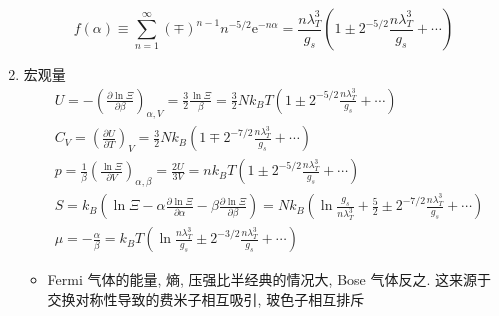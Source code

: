\documentclass[12pt,a4paper]{article}%
\numberwithin{equation}{section}
\newcommand\e{\mathrm{e}}%
\begin{document}
\begin{enumerate}
\begin{equation}
        f(\alpha) \equiv \sum_{n=1}^\infty(\mp)^{n-1}n^{-5/2}\e^{-n\alpha} 
        = \frac{n\lambda_T^3}{g_s}\left(1\pm 2^{-5/2}\frac{n\lambda_T^3}{g_s}+\cdots\right)
    \end{equation}
    \item 宏观量
    \begin{align}
        &U = -\left(\frac{\partial\ln\Xi}{\partial\beta}\right)_{\alpha, V}
        =\frac 32\frac{\ln\Xi}\beta 
        = \frac 32 Nk_B T\left(1\pm 2^{-5/2}\frac{n\lambda_T^3}{g_s} + \cdots\right)\\
        &C_V = \left(\frac{\partial U}{\partial T}\right)_V 
        = \frac 32Nk_B \left(1\mp 2^{-7/2}\frac{n\lambda_T^3}{g_s} + \cdots\right) \label{equ:cv_for_quantum_gas}\\
        &p = \frac 1\beta \left(\frac{\ln\Xi}{\partial V}\right)_{\alpha,\beta} 
        = \frac {2U}{3V} = nk_B T\left(1\pm 2^{-5/2}\frac{n\lambda_T^3}{g_s} + \cdots\right)\\
        &S = k_B\left(\ln\Xi - \alpha\frac{\partial\ln\Xi}{\partial\alpha} - \beta\frac{\partial\ln\Xi}{\partial\beta}\right) 
        = Nk_B\left(\ln\frac{g_s}{n\lambda_T^3} + \frac 52 \pm 2^{-7/2}\frac{n\lambda_T^3}{g_s} + \cdots \right) \\
        &\mu = -\frac{\alpha}{\beta} = k_BT\left(\ln\frac{n\lambda_T^3}{g_s} \pm 2^{-3/2}\frac{n\lambda_T^3}{g_s} + \cdots\right)
    \end{align}
    \begin{itemize}
        \item Fermi 气体的能量, 熵, 压强比半经典的情况大, Bose 气体反之. 
        这来源于交换对称性导致的费米子相互吸引, 玻色子相互排斥
    \end{itemize}
\end{enumerate}
\end{document}
